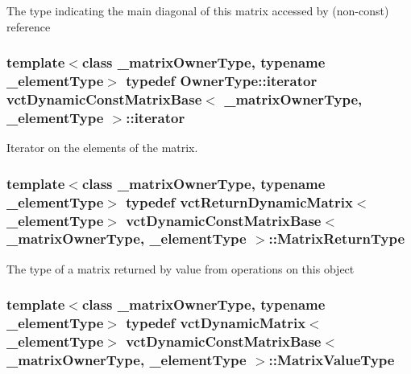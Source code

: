 The type indicating the main diagonal of this matrix accessed by (non-\/const) reference \hypertarget{classvct_dynamic_const_matrix_base_aee4b4524b7972fd1b324cba62505a949}{
\subsubsection[{iterator}]{\setlength{\rightskip}{0pt plus 5cm}template$<$class \-\_\-matrix\-Owner\-Type, typename \-\_\-element\-Type$>$ typedef Owner\-Type\-::iterator {\bf vct\-Dynamic\-Const\-Matrix\-Base}$<$ \-\_\-matrix\-Owner\-Type, \-\_\-element\-Type $>$\-::{\bf iterator}}}\label{classvct_dynamic_const_matrix_base_aee4b4524b7972fd1b324cba62505a949}
Iterator on the elements of the matrix. \hypertarget{classvct_dynamic_const_matrix_base_aed2ac5b2cf673fab97a67418f8e69646}{
\subsubsection[{Matrix\-Return\-Type}]{\setlength{\rightskip}{0pt plus 5cm}template$<$class \-\_\-matrix\-Owner\-Type, typename \-\_\-element\-Type$>$ typedef {\bf vct\-Return\-Dynamic\-Matrix}$<$\-\_\-element\-Type$>$ {\bf vct\-Dynamic\-Const\-Matrix\-Base}$<$ \-\_\-matrix\-Owner\-Type, \-\_\-element\-Type $>$\-::{\bf Matrix\-Return\-Type}}}\label{classvct_dynamic_const_matrix_base_aed2ac5b2cf673fab97a67418f8e69646}
The type of a matrix returned by value from operations on this object \hypertarget{classvct_dynamic_const_matrix_base_ad7a2deb73c9de7bbea753cee80fb2ada}{
\subsubsection[{Matrix\-Value\-Type}]{\setlength{\rightskip}{0pt plus 5cm}template$<$class \-\_\-matrix\-Owner\-Type, typename \-\_\-element\-Type$>$ typedef {\bf vct\-Dynamic\-Matrix}$<$\-\_\-element\-Type$>$ {\bf vct\-Dynamic\-Const\-Matrix\-Base}$<$ \-\_\-matrix\-Owner\-Type, \-\_\-element\-Type $>$\-::{\bf Matrix\-Value\-Type}}}\label{classvct_dynamic_const_matrix_base_ad7a2deb73c9de7bbea753cee80fb2ada}
